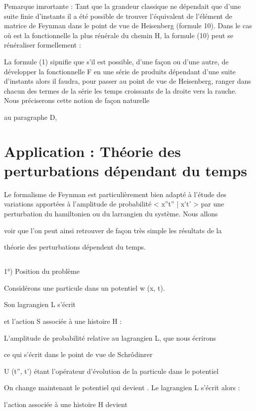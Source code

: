 Pemarque imrortante : 
Tant que la grandeur classique  ne dépendait que d'une suite finie
d'instants  il a été possible de trouver l'équivalent de l'élément
de matrice de Feynman dans le point de vue de Heisenberg (formule 10). Dans
le cas où  est la fonctionnelle la plus rénérale du chemin H, la
formule (10) peut se rénéraliser formellement :

La formule (1) sipnifie que s'il est possible, d'une façon ou d'une autre,
de développer la fonctionnelle F en une série de produits dépendant d'une
suite d'instants  alors il faudra, pour passer au point de vue
de Heisenberg, ranger dans chacun des termes de la série les temps croissants
de la droite vers la rauche. Nous préciserons cette notion de façon naturelle

au paragraphe D,

\section{Application : Théorie des perturbations dépendant du temps} %

Le formalisme de Feynman est particulièrement bien adapté à
l'étude des variations apportées à l'amplitude de probabilité < x''t'' | x't' >
par une perturbation du hamiltonien ou du larrangien du système. Nous allons

voir que l'on peut ainsi retrouver de façon très simple les résultats de la

théorie des perturbations dépendent du temps.


\subsection{}
1°) Position du problème

Considérons une particule dans un potentiel w (x, t).

Son lagrangien L s'écrit

et l'action S associée à une histoire H :

L'amplitude de probabilité relative au lagrangien L, que nous écrirons

ce qui s'écrit dans le point de vue de Schrôdinrer

U (t'', t') étant l'opérateur d'évolution de la particule dans le potentiel

On change maintenant le potentiel qui devient .
Le lagrangien L s'écrit alors :

l'action associée à une histoire H devient

